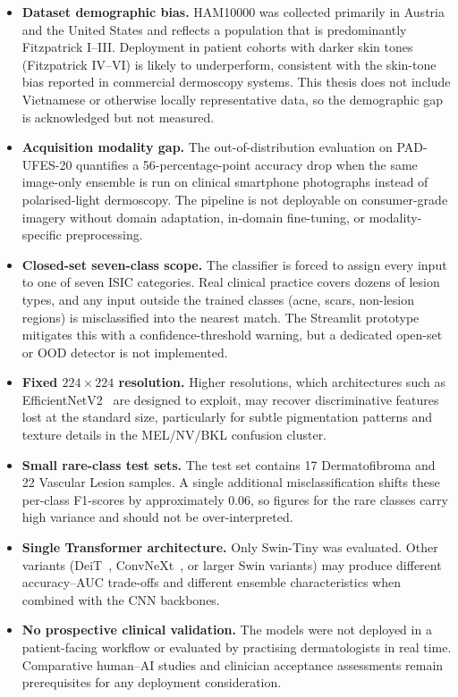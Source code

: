 \begin{itemize}
    \item \textbf{Dataset demographic bias.} HAM10000 was collected primarily in Austria and the United States and reflects a population that is predominantly Fitzpatrick I--III. Deployment in patient cohorts with darker skin tones (Fitzpatrick IV--VI) is likely to underperform, consistent with the skin-tone bias reported in commercial dermoscopy systems. This thesis does not include Vietnamese or otherwise locally representative data, so the demographic gap is acknowledged but not measured.
    \item \textbf{Acquisition modality gap.} The out-of-distribution evaluation on PAD-UFES-20 quantifies a 56-percentage-point accuracy drop when the same image-only ensemble is run on clinical smartphone photographs instead of polarised-light dermoscopy. The pipeline is not deployable on consumer-grade imagery without domain adaptation, in-domain fine-tuning, or modality-specific preprocessing.
    \item \textbf{Closed-set seven-class scope.} The classifier is forced to assign every input to one of seven ISIC categories. Real clinical practice covers dozens of lesion types, and any input outside the trained classes (acne, scars, non-lesion regions) is misclassified into the nearest match. The Streamlit prototype mitigates this with a confidence-threshold warning, but a dedicated open-set or OOD detector is not implemented.
    \item \textbf{Fixed $224 \times 224$ resolution.} Higher resolutions, which architectures such as EfficientNetV2~\cite{tan2021efficientnetv2} are designed to exploit, may recover discriminative features lost at the standard size, particularly for subtle pigmentation patterns and texture details in the MEL/NV/BKL confusion cluster.
    \item \textbf{Small rare-class test sets.} The test set contains 17 Dermatofibroma and 22 Vascular Lesion samples. A single additional misclassification shifts these per-class F1-scores by approximately 0.06, so figures for the rare classes carry high variance and should not be over-interpreted.
    \item \textbf{Single Transformer architecture.} Only Swin-Tiny was evaluated. Other variants (DeiT~\cite{touvron2021deit}, ConvNeXt~\cite{liu2022convnext}, or larger Swin variants) may produce different accuracy--AUC trade-offs and different ensemble characteristics when combined with the CNN backbones.
    \item \textbf{No prospective clinical validation.} The models were not deployed in a patient-facing workflow or evaluated by practising dermatologists in real time. Comparative human--AI studies and clinician acceptance assessments remain prerequisites for any deployment consideration.
\end{itemize}

